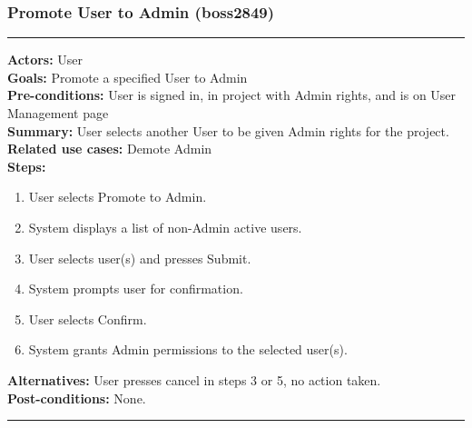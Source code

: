 \documentclass[11pt]{report}
\begin{document}
\subsubsection{Promote User to Admin  (boss2849)}
\vspace{2pt}
\hrule
\vspace{8pt}
 \textbf{Actors:} User \\ 
 \textbf{Goals:} Promote a specified User to Admin \\
 \textbf{Pre-conditions:} User is signed in, in project with Admin rights, and is on User Management page \\
 \textbf{Summary:} User selects another User to be given Admin rights for the project. \\ 
 \textbf{Related use cases:} Demote Admin \\ 
 \textbf{Steps:} \begin{enumerate}
  \item User selects Promote to Admin.
  \item System displays a list of non-Admin active users.
  \item User selects user(s) and presses Submit.
  \item System prompts user for confirmation.
  \item User selects Confirm.
  \item System grants Admin permissions to the selected user(s).
 \end{enumerate}
 \textbf{Alternatives:} User presses cancel in steps 3 or 5, no action taken. \\
 \textbf{Post-conditions:} None. \\
 \vspace{8pt}
\hrule
\newpage
\end{document}
